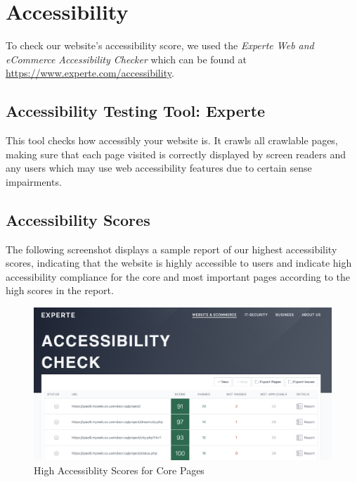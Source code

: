 \documentclass[12pt, letterpaper]{article}
\begin{document}
 \newpage

\section{Accessibility}

To check our website's accessibility score, we used the \textit{Experte Web and eCommerce Accessibility Checker} which can be found at \url{https://www.experte.com/accessibility}. 

\subsection*{Accessibility Testing Tool: Experte}
This tool checks how accessibly your website is. It crawls all crawlable pages, making sure that each page visited is correctly displayed by screen readers and any users which may use web accessibility features due to certain sense impairments.

\subsection*{Accessibility Scores}
The following screenshot displays a sample report of our highest accessibility scores, indicating that the website is highly accessible to users and indicate high accessibility compliance for the core and most important pages according to the high scores in the report.

\begin{figure}[htbp]
	\centering
	\includegraphics[width=\textwidth]{images/26-accessiblity-score.png}
	\caption{High Accessiblity Scores for Core Pages}
 \end{figure}
\end{document}
